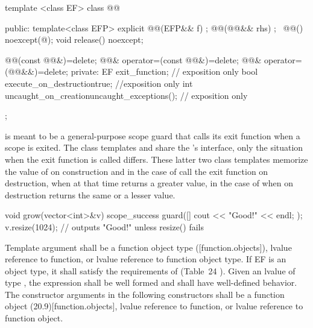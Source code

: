 \documentclass[ebook,11pt,article]{memoir}
\begin{document}
\begin{codeblock}
template <class EF>
class @@ {
public:
  template<class EFP>
  explicit @@(EFP&& f) ;
  @@(@@&& rhs) ;
  ~@@() noexcept(@\seebelow@);
  void release() noexcept;

  @@(const @@&)=delete;
  @@& operator=(const @@&)=delete;
  @@& operator=(@@&&)=delete;
private:
  EF exit_function;    // exposition only
  bool execute_on_destruction{true}; //exposition only
  int  uncaught_on_creation{uncaught_exceptions()}; // exposition only
};

\end{codeblock}
\pnum
\begin{note}
 is meant to be a general-purpose scope guard that calls its exit function when a scope is exited. The class templates  and  share the 's interface, only the situation when the exit function is called differs. These latter two class templates memorize the value of  on construction and in the case of  call the exit function on destruction, when  at that time returns a greater value, in the case of  when  on destruction returns the same or a lesser value.\\
\begin{example}
\begin{codeblock}
void grow(vector<int>&v){
	scope_success guard([]{ cout << "Good!" << endl; });
	v.resize(1024); 
} // outputs "Good!" unless resize() fails
\end{codeblock}
\end{example}
\end{note}


\pnum
\requires
Template argument  shall be a function object type ([function.objects]), 
lvalue reference to function, or 
lvalue reference to function object type.
If EF is an object type, it  shall satisfy
the requirements of  (Table~24
). 
Given an lvalue  of type , the expression  shall be well formed and shall have well-defined behavior.
The constructor arguments  in the following constructors shall be a function object (20.9)[function.objects], 
lvalue reference to function, or 
lvalue reference to function object.
\end{document}
